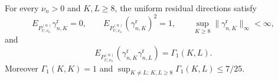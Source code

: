 For every \(\nu_n>0\) and \(K,L\geq8\), the uniform residual directions satisfy
\[
 E_{P_{U,\nu_n}^{(n)}}\gamma_{n,K}^{\mathrm r}=0,\qquad
 E_{P_{U,\nu_n}^{(n)}}(\gamma_{n,K}^{\mathrm r})^2=1,
 \qquad \sup_{K\geq8}\|\gamma_{n,K}^{\mathrm r}\|_\infty<\infty,
\]
and
\[
 E_{P_{U,\nu_n}^{(n)}}(\gamma_{n,K}^{\mathrm r}\gamma_{n,L}^{\mathrm r})
 =\Gamma_1(K,L).
\]
Moreover \(\Gamma_1(K,K)=1\) and \(\sup_{K\ne L;\,K,L\geq8}\Gamma_1(K,L)\leq7/25\).